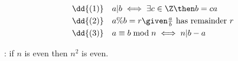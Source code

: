 \documentclass[basic, header]{nosvagor-notes}
\begin{document}
\hrulefill
\vspace{0.5em}
  \begin{center}
  \end{center}
  \vspace{-1em}
  \begin{align*}
    &\dd{(1)} \quad a|b \iff \exists c \in \Z \then b = ca \\
    &\dd{(2)} \quad a\%b = r \given \tfrac{a}{b} ~\text{has remainder}~ r \\
    &\dd{(3)} \quad a \equiv b \bmod n \iff n|b - a
  \end{align*}

  : if \(n\) is even then \(n^2\) is even. \quad {}\\

\hrulefill

\vspace{2em}
\end{document}
